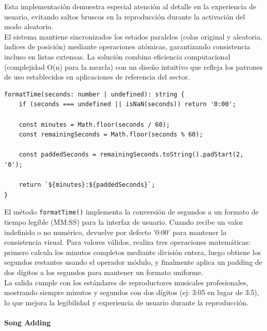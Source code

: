 \documentclass[11pt, a4paper]{article}
\begin{document}
                Esta implementación demuestra especial atención al detalle en la experiencia de usuario, evitando saltos bruscos en la reproducción durante la activación del modo aleatorio. \\

                El sistema mantiene sincronizados los estados paralelos (colas original y aleatoria, índices de posición) mediante operaciones atómicas, garantizando consistencia incluso en listas extensas. La solución combina eficiencia computacional (complejidad O(n) para la mezcla) con un diseño intuitivo que refleja los patrones de uso establecidos en aplicaciones de referencia del sector.

                \begin{lstlisting}[caption={formatTime()}]
formatTime(seconds: number | undefined): string {
    if (seconds === undefined || isNaN(seconds)) return '0:00';
    
    const minutes = Math.floor(seconds / 60);
    const remainingSeconds = Math.floor(seconds % 60);
    
    const paddedSeconds = remainingSeconds.toString().padStart(2, '0');
    
    return `${minutes}:${paddedSeconds}`;
}
                \end{lstlisting}

                El método \verb|formatTime()| implementa la conversión de segundos a un formato de tiempo legible (MM:SS) para la interfaz de usuario. Cuando recibe un valor indefinido o no numérico, devuelve por defecto '0:00' para mantener la consistencia visual. Para valores válidos, realiza tres operaciones matemáticas: primero calcula los minutos completos mediante división entera, luego obtiene los segundos restantes usando el operador módulo, y finalmente aplica un padding de dos dígitos a los segundos para mantener un formato uniforme. \\

                La salida cumple con los estándares de reproductores musicales profesionales, mostrando siempre minutos y segundos con dos dígitos (ej: 3:05 en lugar de 3:5), lo que mejora la legibilidad y experiencia de usuario durante la reproducción. \\

                \paragraph{Song Adding}
                ‎
\end{document}
